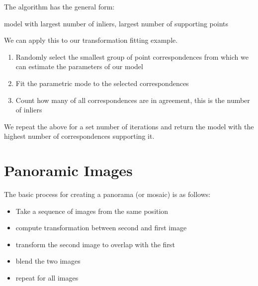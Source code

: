 \documentclass{article}
\begin{document}
 The algorithm has the general form:

 \begin{algorithm}
 \Return model with largest number of inliers, largest number of supporting points
 \end{algorithm}

 We can apply this to our transformation fitting example.

 \begin{enumerate}
   \item Randomly select the smallest group of point correspondences from which we can estimate the parameters of our model

   \item Fit the parametric mode to the selected correspondences

   \item Count how many of all correspondences are in agreement, this is the number of inliers

 \end{enumerate}

 We repeat the above for a set number of iterations and return the model with the highest number of correspondences supporting it.

 \section{Panoramic Images}

 The basic process for creating a panorama (or mosaic) is as follows:

 \begin{itemize}
\item Take a sequence of images from the same position
   \item compute transformation between second and first image
   \item transform the second image to overlap with the first
   \item blend the two images
   \item repeat for all images
 \end{itemize}
\end{document}
